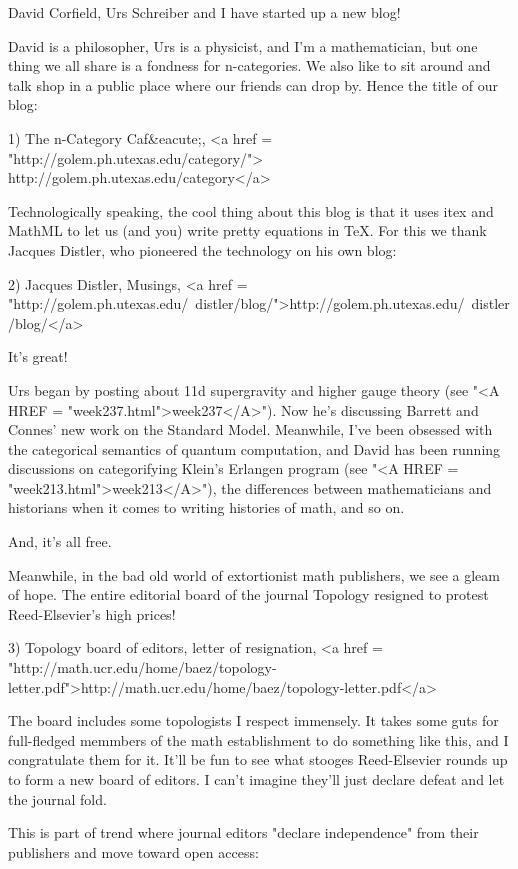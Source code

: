 


David Corfield, Urs Schreiber and I have started up a new blog!

David is a philosopher, Urs is a physicist, and I'm a mathematician,
but one thing we all share is a fondness for n-categories.  We 
also like to sit around and talk shop in a public place where our 
friends can drop by.  Hence the title of our blog:

1) The n-Category Caf&eacute;, <a href =
"http://golem.ph.utexas.edu/category/">
http://golem.ph.utexas.edu/category</a>

Technologically speaking, the cool thing about this blog is that it
uses itex and MathML to let us (and you) write pretty equations in TeX.
For this we thank Jacques Distler, who pioneered the technology on
his own blog:


2) Jacques Distler, Musings, <a href = "http://golem.ph.utexas.edu/~distler/blog/">http://golem.ph.utexas.edu/~distler/blog/</a>

It's great!

Urs began by posting about 11d supergravity and higher gauge theory
(see "<A HREF = "week237.html">week237</A>").  Now he's
discussing Barrett and Connes' new work on the Standard Model.
Meanwhile, I've been obsessed with the categorical semantics of
quantum computation, and David has been running discussions on
categorifying Klein's Erlangen program (see "<A HREF =
"week213.html">week213</A>"), the differences between
mathematicians and historians when it comes to writing histories of
math, and so on.

And, it's all free.

Meanwhile, in the bad old world of extortionist math publishers,
we see a gleam of hope.  The entire editorial board of the journal 
Topology resigned to protest Reed-Elsevier's high prices!

3) Topology board of editors, letter of resignation,
<a href = "http://math.ucr.edu/home/baez/topology-letter.pdf">http://math.ucr.edu/home/baez/topology-letter.pdf</a>

The board includes some topologists I respect immensely.  It takes 
some guts for full-fledged memmbers of the math establishment to 
do something like this, and I congratulate them for it.  It'll be
fun to see what stooges Reed-Elsevier rounds up to form a new board 
of editors.  I can't imagine they'll just declare defeat and let the 
journal fold.

This is part of trend where journal editors "declare independence"
from their publishers and move toward open access:

